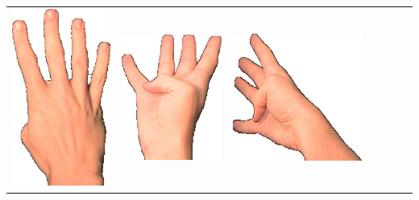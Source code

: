 \documentclass{article}
\begin{document}
\begin{center}
\begin{tabular}{r*{6}{c}}
\includegraphics[scale=0.1]{images/04-01-3.jpg}&
\includegraphics[scale=0.1]{images/04-01-4.jpg}&
\includegraphics[scale=0.1]{images/04-01-5.jpg}&

\end{tabular}
\end{center}
\end{document}
